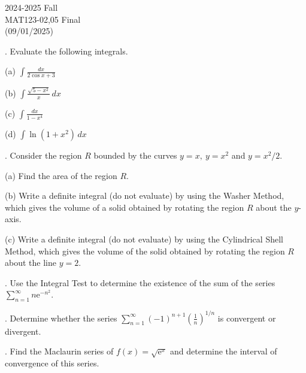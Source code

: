 \documentclass{article}
\begin{document}
\pagestyle{empty}
\large

\begin{center}
2024-2025 Fall \\MAT123-02,05 Final\\(09/01/2025)
\end{center}

. Evaluate the following integrals.

\hfill

\noindent (a) $\displaystyle\int\frac{dx}{2\cos x+3}$

\hfill

\hfill

\noindent (b) $\displaystyle\int\frac{\sqrt{5-x^2}}{x}\,dx$

\hfill

\hfill

\noindent (c) $\displaystyle\int\frac{dx}{1-x^4}$

\hfill

\hfill

\noindent (d) $\displaystyle\int\ln\left(1+x^2\right)\,dx$

\hfill

\hfill

. Consider the region $R$ bounded by the curves $y=x,\:y=x^2$ and $y=x^2/2$.

\hfill

\noindent (a) Find the area of the region $R$.

\hfill

\noindent (b) Write a definite integral (do not evaluate) by using the Washer Method, which gives the volume of a solid obtained by rotating the region $R$ about the $y$-axis.

\hfill

\noindent (c) Write a definite integral (do not evaluate) by using the Cylindrical Shell Method, which gives the volume of the solid obtained by rotating the region $R$ about the line $y=2$.

\hfill

. Use the Integral Test to determine the existence of the sum of the series $\displaystyle\sum_{n=1}^\infty n\mathrm{e}^{-n^2}$.

\hfill

. Determine whether the series $\displaystyle\sum_{n=1}^\infty(-1)^{n+1}\left(\frac1n\right)^{1/n}$ is convergent or divergent.

\hfill

. Find the Maclaurin series of $f(x)=\sqrt{\mathrm{e}^x}$ and determine the interval of convergence of this series.
\end{document}
